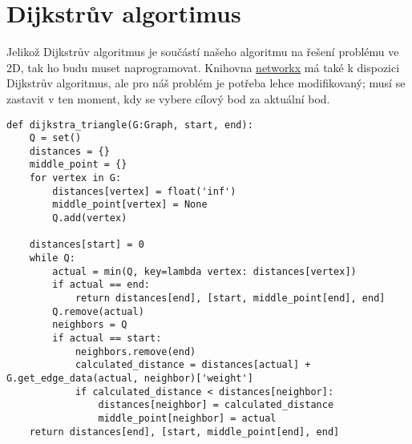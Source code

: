 \section{Dijkstrův algortimus}
\label{sec:dijkstra_program}

Jelikož Dijkstrův algoritmus je součástí našeho algoritmu na řešení problému ve 2D, tak ho budu muset naprogramovat. Knihovna \href{https://networkx.org/}{networkx} má také k dispozici Dijkstrův algoritmus, ale pro náš problém je potřeba lehce modifikovaný; musí se zastavit v ten moment, kdy se vybere cílový bod za aktuální bod. 

\begin{lstlisting}[style=me]
def dijkstra_triangle(G:Graph, start, end):
    Q = set()
    distances = {} 
    middle_point = {} 
    for vertex in G:
        distances[vertex] = float('inf')
        middle_point[vertex] = None
        Q.add(vertex)

    distances[start] = 0
    while Q: 
        actual = min(Q, key=lambda vertex: distances[vertex])
        if actual == end:
            return distances[end], [start, middle_point[end], end]
        Q.remove(actual)
        neighbors = Q
        if actual == start:
            neighbors.remove(end)
            calculated_distance = distances[actual] + G.get_edge_data(actual, neighbor)['weight']
            if calculated_distance < distances[neighbor]:
                distances[neighbor] = calculated_distance
                middle_point[neighbor] = actual
    return distances[end], [start, middle_point[end], end]
\end{lstlisting}